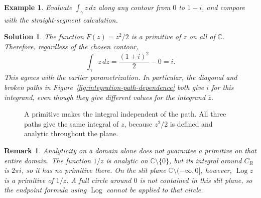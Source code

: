 \documentclass{report}
\newtheorem{remark}{Remark}
\newtheorem{example}{Example}
\newtheorem{solution}{Solution}
\begin{document}
\begin{example}
    Evaluate $\displaystyle\int_\gamma z\,dz$ along any contour from
    $0$ to $1+i$, and compare with the straight-segment calculation.
\end{example}
\begin{solution}
    The function $F(z)=z^2/2$ is a primitive of $z$ on all of $\mathbb C$.
    Therefore, regardless of the chosen contour,
    \[
        \int_\gamma z\,dz=\frac{(1+i)^2}{2}-0=i.
    \]
    This agrees with the earlier parametrization. In particular, the
    diagonal and broken paths in Figure~\ref{fig:integration-path-dependence}
    both give $i$ for this integrand, even though they give different values
    for the integrand $\bar z$.
\end{solution}

\begin{figure}[H]
    \centering
    \caption{A primitive makes the integral independent of the path.
    All three paths give the same integral of $z$, because $z^2/2$ is
    defined and analytic throughout the plane.}
    \label{fig:integration-primitive}
\end{figure}

\begin{remark}
    Analyticity on a domain alone does not guarantee a primitive on that
    entire domain. The function $1/z$ is analytic on
    $\mathbb C\setminus\{0\}$, but its integral around $C_R$ is $2\pi i$,
    so it has no primitive there. On the slit plane
    $\mathbb C\setminus(-\infty,0]$, however, $\operatorname{Log}z$ is a
    primitive of $1/z$. A full circle around $0$ is not contained in this
    slit plane, so the endpoint formula using $\operatorname{Log}$ cannot
    be applied to that circle.
\end{remark}
\end{document}
